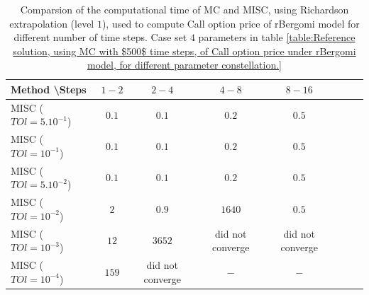 \documentclass[11pt]{article}
\begin{document}
\begin{table}[h!]
	\centering
	\begin{tabular}{l*{6}{c}r}
		Method \textbackslash  Steps            & $1-2$ & $2-4$ & $4-8$ & $8-16$ &   \\
		\hline
		MISC ($TOl=5.10^{-1}$)  & $0.1$ & $0.1$ & $0.2$ & $0.5$  \\
		MISC ($TOl=10^{-1}$)  & $0.1$ & $0.1$ & $0.2$ & $0.5$   \\
		MISC ($TOl=5.10^{-2}$)  &$0.1$ & $0.1$ & $0.2$ & $0.5$   \\
		MISC ($TOl=10^{-2}$)  & $2$ & $0.9$ & $1640$ & $0.5$   \\	
		MISC ($TOl=10^{-3}$)  & $12$ & $3652$ & did not converge & did not converge  \\
		MISC ($TOl=10^{-4}$)  & $159$ & did not converge & $-$ & $-$   \\
		\hline
	\end{tabular}
	\caption{Comparsion of the computational time of  MC and MISC, using Richardson extrapolation (level $1$), used to compute Call option price of rBergomi model for different number of time steps. Case set $4$ parameters in table \ref{table:Reference solution, using MC with $500$ time steps, of Call option price under rBergomi model, for different parameter constellation.}}
	\label{Comparsion of the computational time of  MC and MISC, using Richardson extrapolation (level $1$), used to compute Call option price of rBergomi model for different number of time steps. Case set $4$ parameters}
\end{table}



\FloatBarrier
\end{document}
